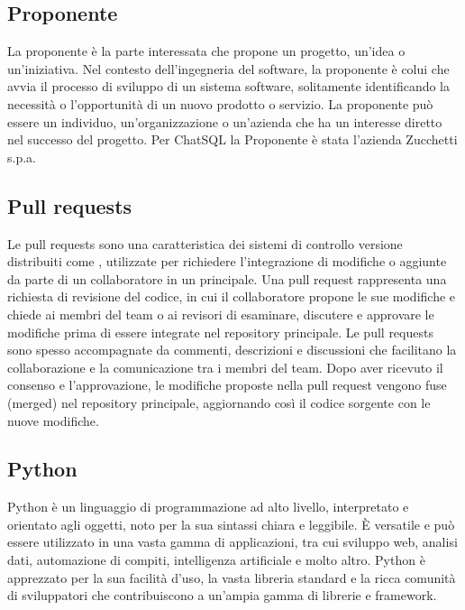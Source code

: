 \vspace{2em}
\subsection*{Proponente}
La proponente è la parte interessata che propone un progetto, un'idea o un'iniziativa. Nel contesto dell'ingegneria del software, la proponente è colui che avvia il processo di sviluppo di un sistema software, solitamente identificando la necessità o l'opportunità di un nuovo prodotto o servizio. La proponente può essere un individuo, un'organizzazione o un'azienda che ha un interesse diretto nel successo del progetto. Per ChatSQL la Proponente è stata l'azienda Zucchetti s.p.a.

\vspace{2em}
\subsection*{Pull requests}
Le pull requests sono una caratteristica dei sistemi di controllo versione distribuiti come , utilizzate per richiedere l'integrazione di modifiche o aggiunte da parte di un collaboratore in un  principale. Una pull request rappresenta una richiesta di revisione del codice, in cui il collaboratore propone le sue modifiche e chiede ai membri del team o ai revisori di esaminare, discutere e approvare le modifiche prima di essere integrate nel repository principale. Le pull requests sono spesso accompagnate da commenti, descrizioni e discussioni che facilitano la collaborazione e la comunicazione tra i membri del team. Dopo aver ricevuto il consenso e l'approvazione, le modifiche proposte nella pull request vengono fuse (merged) nel repository principale, aggiornando così il codice sorgente con le nuove modifiche.

\vspace{2em}
\subsection*{Python}
Python è un linguaggio di programmazione ad alto livello, interpretato e orientato agli oggetti, noto per la sua sintassi chiara e leggibile. È versatile e può essere utilizzato in una vasta gamma di applicazioni, tra cui sviluppo web, analisi dati, automazione di compiti, intelligenza artificiale e molto altro. Python è apprezzato per la sua facilità d'uso, la vasta libreria standard e la ricca comunità di sviluppatori che contribuiscono a un'ampia gamma di librerie e framework.
